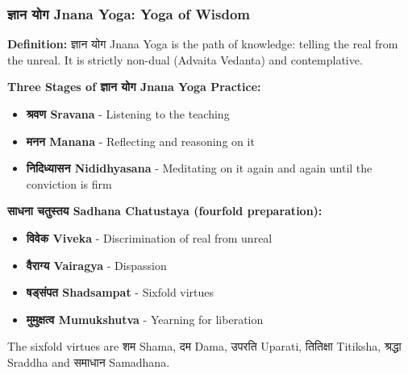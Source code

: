 
\begin{frame}[fragile]\frametitle{ज्ञान योग  Jnana Yoga: Yoga of Wisdom}
    \textbf{Definition:} ज्ञान योग  Jnana Yoga is the path of knowledge: telling the real from the unreal. It is strictly non-dual (Advaita Vedanta) and contemplative.


    \textbf{Three Stages of ज्ञान योग  Jnana Yoga Practice:}
    \begin{itemize}
        \item \textbf{श्रवण Sravana} - Listening to the teaching
        \item \textbf{मनन Manana} - Reflecting and reasoning on it
        \item \textbf{निदिध्यासन  Nididhyasana} - Meditating on it again and again until the conviction is firm
    \end{itemize}

    \textbf{साधना चतुस्तय Sadhana Chatustaya (fourfold preparation):}
    \begin{itemize}
        \item \textbf{विवेक Viveka} - Discrimination of real from unreal
        \item \textbf{वैराग्य Vairagya} - Dispassion
        \item \textbf{षड्संपत Shadsampat} - Sixfold virtues
        \item \textbf{मुमुक्षत्व Mumukshutva} - Yearning for liberation
    \end{itemize}
	
The sixfold virtues are शम  Shama, दम  Dama, उपरति  Uparati, तितिक्षा Titiksha, श्रद्धा Sraddha and समाधान Samadhana.
	
\end{frame}


